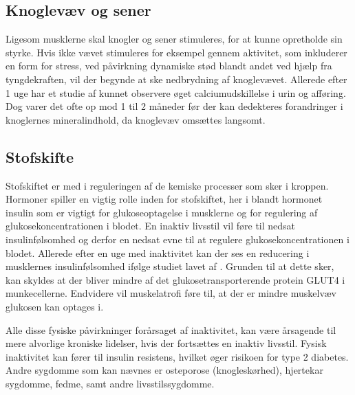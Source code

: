 \subsection{Knoglevæv og sener}
Ligesom musklerne skal knogler og sener stimuleres, for at kunne opretholde sin styrke. Hvis ikke vævet stimuleres for eksempel gennem aktivitet, som inkluderer en form for stress, ved påvirkning dynamiske stød blandt andet ved hjælp fra tyngdekraften, vil der begynde at ske nedbrydning af knoglevævet. Allerede efter 1 uge har et studie af \citep{Bloomsfield1995} kunnet observere øget calciumudskillelse i urin og afføring. Dog varer det ofte op mod 1 til 2 måneder før der kan dedekteres forandringer i knoglernes mineralindhold, da knoglevæv omsættes langsomt. \citep{Bloomfield1995}

\subsection{Stofskifte}
Stofskiftet er med i reguleringen af de kemiske processer som sker i kroppen. Hormoner spiller en vigtig rolle inden for stofskiftet, her i blandt hormonet insulin som er vigtigt for glukoseoptagelse i musklerne og for regulering af glukosekoncentrationen i blodet. En inaktiv livsstil vil føre til nedsat insulinfølsomhed og derfor en nedsat evne til at regulere glukosekoncentrationen i blodet. Allerede efter en uge med inaktivitet kan der ses en reducering i musklernes insulinfølsomhed ifølge studiet lavet af \citep{Mikines1991}. Grunden til at dette sker, kan skyldes at der bliver mindre af det glukosetransporterende protein GLUT4 i munkecellerne. Endvidere vil muskelatrofi føre til, at der er mindre muskelvæv glukosen kan optages i. \citep{Tabata1999}

Alle disse fysiske påvirkninger forårsaget af inaktivitet, kan være årsagende til mere alvorlige kroniske lidelser, hvis der fortsættes en inaktiv livsstil. Fysisk inaktivitet kan fører til insulin resistens, hvilket øger risikoen for type 2 diabetes. Andre sygdomme som kan nævnes er osteporose (knogleskørhed), hjertekar sygdomme, fedme, samt andre livsstilssygdomme. \citep{motionsraad2007}
